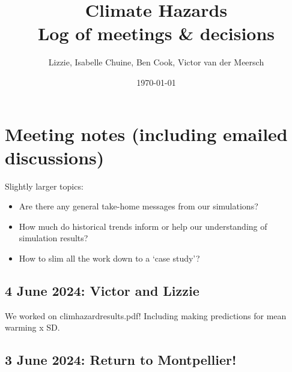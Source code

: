 \documentclass[11pt,letter]{article}
\begin{document}

\renewcommand{\refname}{\CHead{}}

\title{Climate Hazards \\ Log of meetings \& decisions}
\author{Lizzie, Isabelle Chuine, Ben Cook, Victor van der Meersch}
\date{\today}
\maketitle
\tableofcontents

\setlength{\parindent}{0pt}
\setlength{\parskip}{3pt}

\section{Meeting notes (including emailed discussions)}

Slightly larger topics: 
\begin{itemize}
\item Are there any general take-home messages from our simulations?
\item How much do historical trends inform or help our understanding of simulation results?
\item How to slim all the work down to a `case study'? 
\end{itemize}

\subsection{4 June 2024: Victor and Lizzie}

We worked on climhazardresults.pdf! Including making predictions for mean warming x SD. 

\subsection{3 June 2024: Return to Montpellier!}
\end{document}
